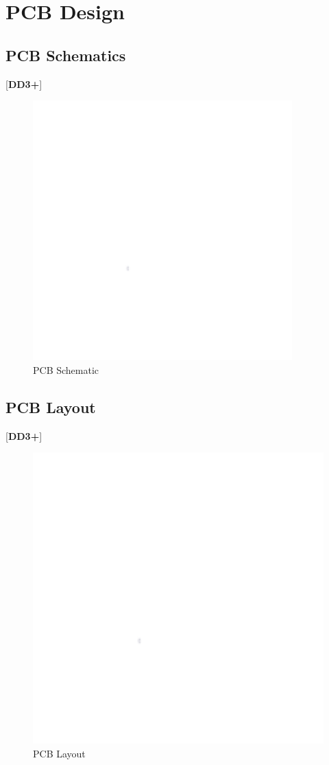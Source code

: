 \clearpage
\section{PCB Design}
\subsection{PCB Schematics}
[\textbf{DD3+}]
\begin{figure}[!h]
    \centering
    \includegraphics[width=10cm]{images/white.png} %
    \caption{PCB Schematic}
\end{figure}

\clearpage
\subsection{PCB Layout}
[\textbf{DD3+}]
\begin{figure}[h]
    \centering
    \includegraphics[width=16cm]{images/white.png} %
    \caption{PCB Layout}
\end{figure}